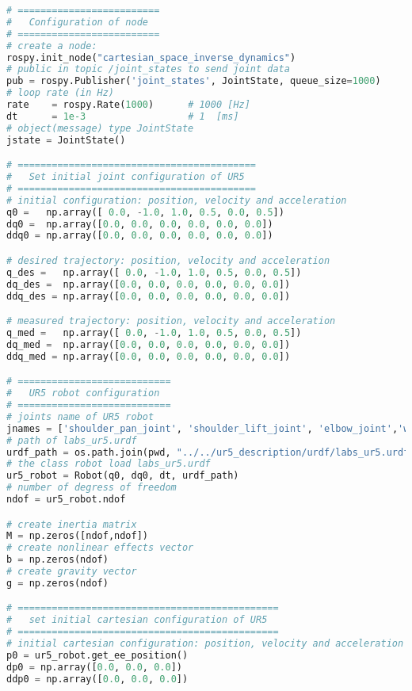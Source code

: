 \begin{lstlisting}[language=Python, caption={Move the ur5 robot end-effector using the Cartesian space inverse dynamics and null space projection, \eqref{eq:cartesian_idyn_N} to follows the Cartesian sinusoidal reference of activity \ref{subsec:generate_sinusoidal_reference}.}, label={lst:cartesian_idyn_N}]
# =========================
#   Configuration of node
# =========================
# create a node: 
rospy.init_node("cartesian_space_inverse_dynamics")
# public in topic /joint_states	to send joint data	
pub = rospy.Publisher('joint_states', JointState, queue_size=1000)
# loop rate (in Hz)
rate 	= rospy.Rate(1000)		# 1000 [Hz]
dt 		= 1e-3					# 1  [ms]
# object(message) type JointState
jstate = JointState()

# ==========================================
#   Set initial joint configuration of UR5
# ==========================================
# initial configuration: position, velocity and acceleration 
q0 =   np.array([ 0.0, -1.0, 1.0, 0.5, 0.0, 0.5])
dq0 =  np.array([0.0, 0.0, 0.0, 0.0, 0.0, 0.0]) 
ddq0 = np.array([0.0, 0.0, 0.0, 0.0, 0.0, 0.0]) 

# desired trajectory: position, velocity and acceleration
q_des =   np.array([ 0.0, -1.0, 1.0, 0.5, 0.0, 0.5])
dq_des =  np.array([0.0, 0.0, 0.0, 0.0, 0.0, 0.0]) 
ddq_des = np.array([0.0, 0.0, 0.0, 0.0, 0.0, 0.0]) 

# measured trajectory: position, velocity and acceleration
q_med =   np.array([ 0.0, -1.0, 1.0, 0.5, 0.0, 0.5])
dq_med =  np.array([0.0, 0.0, 0.0, 0.0, 0.0, 0.0]) 
ddq_med = np.array([0.0, 0.0, 0.0, 0.0, 0.0, 0.0]) 

# ===========================
#   UR5 robot configuration
# ===========================
# joints name of UR5 robot
jnames = ['shoulder_pan_joint', 'shoulder_lift_joint', 'elbow_joint','wrist_1_joint', 'wrist_2_joint', 'wrist_3_joint']
# path of labs_ur5.urdf
urdf_path = os.path.join(pwd, "../../ur5_description/urdf/labs_ur5.urdf")
# the class robot load labs_ur5.urdf
ur5_robot = Robot(q0, dq0, dt, urdf_path)
# number of degress of freedom
ndof = ur5_robot.ndof

# create inertia matrix 
M = np.zeros([ndof,ndof])
# create nonlinear effects vector
b = np.zeros(ndof)
# create gravity vector
g = np.zeros(ndof)

# ==============================================
#   set initial cartesian configuration of UR5
# ==============================================
# initial cartesian configuration: position, velocity and acceleration
p0 = ur5_robot.get_ee_position()
dp0 = np.array([0.0, 0.0, 0.0])
ddp0 = np.array([0.0, 0.0, 0.0])


\end{lstlisting}
